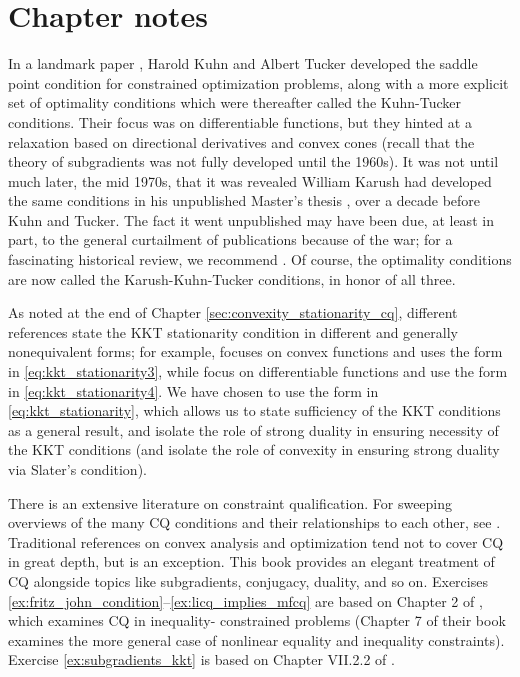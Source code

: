 \SkipTocEntry\section*{Chapter notes}

In a landmark paper \cite{kuhn1951nonlinear}, Harold Kuhn and Albert Tucker
developed the saddle point condition for constrained optimization problems,
along with a more explicit set of optimality conditions which were thereafter
called the Kuhn-Tucker conditions. Their focus was on differentiable functions,
but they hinted at a relaxation based on directional derivatives and
convex cones (recall that the theory of subgradients was not fully developed
until the 1960s). It was not until much later, the mid 1970s, that it was
revealed  William Karush had developed the same conditions in his unpublished
Master's thesis \cite{karush1939minima}, over a decade before Kuhn and 
Tucker. The fact it went unpublished may have been due, at least in part, to the  
general curtailment of publications because of the war; for a fascinating
historical review, we  recommend \cite{kuhn1976nonlinear,
  kjeldsen2000contextualized, cottle2012william}. Of course, the optimality
conditions are now called the Karush-Kuhn-Tucker conditions, in honor of all
three.     

As noted at the end of Chapter \ref{sec:convexity_stationarity_cq}, different
references state the KKT stationarity condition in different and generally
nonequivalent forms; for example, \cite{rockafellar1970convex} focuses on convex
functions and uses the form in \eqref{eq:kkt_stationarity3}, while
\cite{boyd2004convex} focus on differentiable functions and use the form in
\eqref{eq:kkt_stationarity4}. We have chosen to use the form in
\eqref{eq:kkt_stationarity}, which allows us to state sufficiency of the KKT
conditions as a general result, and isolate the role of strong duality in
ensuring necessity of the KKT conditions (and isolate the role of convexity in
ensuring strong duality via Slater's condition).

There is an extensive literature on constraint qualification. For sweeping
overviews of the many CQ conditions and their relationships to each other, 
see \cite{peterson1973review, giorgi2018guided}. Traditional references on
convex analysis and optimization tend not to cover CQ in great depth, but   
\cite{borwein2006convex} is an exception. This book provides an elegant
treatment of CQ alongside topics like subgradients, conjugacy, duality, and so
on. Exercises \ref{ex:fritz_john_condition}--\ref{ex:licq_implies_mfcq} are
based on Chapter 2 of \cite{borwein2006convex}, which examines CQ in inequality-
constrained problems (Chapter 7 of their book examines the more general case of 
nonlinear equality and inequality constraints). Exercise
\ref{ex:subgradients_kkt} is based on Chapter VII.2.2 of 
\cite{hiriartUrruty1993convex}. 

